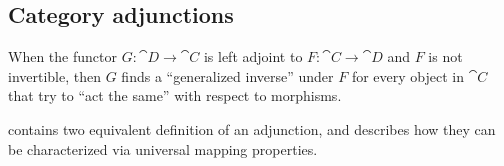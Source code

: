 \subsection{Category adjunctions}\label{subsec:category_adjunctions}

\begin{remark}\label{rem:adjoint_functors}\cite{StanfordPlato:category_theory}
  When the functor \( G: \cat{D} \to \cat{C} \) is left adjoint to \( F: \cat{C} \to \cat{D} \) and \( F \) is not invertible, then \( G \) finds a \enquote{generalized inverse} under \( F \) for every object in \( \cat{C} \) that try to \enquote{act the same} with respect to morphisms.

   contains two equivalent definition of an adjunction, and  describes how they can be characterized via universal mapping properties.
\end{remark}

